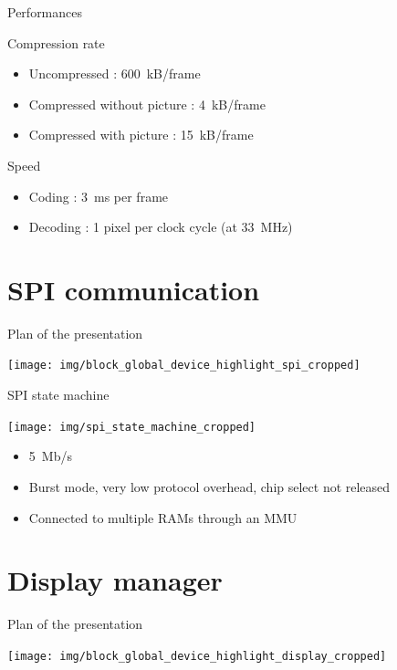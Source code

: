 \documentclass[10pt, notes]{beamer}
\begin{document}
\begin{frame}{Performances}
    \begin{defaultblock}{Compression rate}
        \begin{itemize}
            \item Uncompressed : \SI{600}{kB/frame}
            \item Compressed without picture : \SI{4}{kB/frame}
            \item Compressed with picture : \SI{15}{kB/frame} 
        \end{itemize}
    \end{defaultblock}
        
    \begin{defaultblock}{Speed}
        \begin{itemize}
            \item Coding : \SI{3}{ms} per frame
            \item Decoding : 1 pixel per clock cycle (at \SI{33}{\mega\hertz})
        \end{itemize}
    \end{defaultblock}
\end{frame}

\section{SPI communication}
\begin{frame}{Plan of the presentation}
    \begin{center}
        \texttt{[image: img/block\_global\_device\_highlight\_spi\_cropped]}
    \end{center}
\end{frame}

\begin{frame}{SPI state machine}
    \begin{center}
        \texttt{[image: img/spi\_state\_machine\_cropped]}
    \end{center}

    \begin{itemize}
        \item \SI{5}{Mb/s}
        \item Burst mode, very low protocol overhead, chip select not released
        \item Connected to multiple RAMs through an MMU
    \end{itemize}
\end{frame}

\section{Display manager}
\begin{frame}{Plan of the presentation}
    \begin{center}
        \texttt{[image: img/block\_global\_device\_highlight\_display\_cropped]}
    \end{center}
\end{frame}
\end{document}
